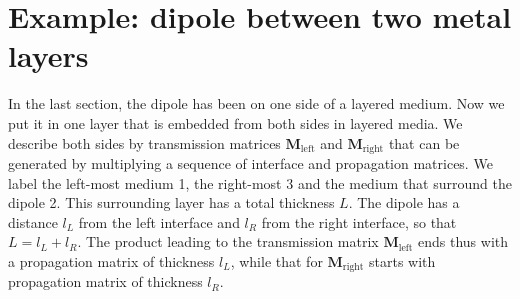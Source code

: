 \section{Example: dipole between two metal layers}


In the last section, the dipole has been on one side of a layered medium. Now we put it in one layer that is embedded from both sides in layered media. We describe both sides by transmission matrices $\mathbf{M}_\text{left}$ and $\mathbf{M}_\text{right}$ that can be generated by multiplying  a sequence of interface and propagation matrices. We label the left-most medium 1, the right-most 3 and the medium that surround the dipole 2. This surrounding layer has a total thickness $L$. The dipole has a distance $l_L$ from the left interface and $l_R$ from the right interface, so that $L = l_L + l_R$. The product leading to the  transmission matrix $\mathbf{M}_\text{left}$ ends thus with a propagation matrix of thickness $l_L$, while that for  $\mathbf{M}_\text{right}$ starts with propagation matrix of thickness $l_R$.

